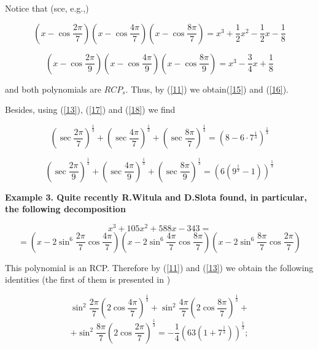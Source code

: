 \documentclass[12pt,oneside,english]{amsart}
\begin{document}
Notice that (sce, e.g.,\cite{6})

\begin{equation}\label{17}
\left(x-\cos\frac{2\pi}{7}\right)\left(x-\cos\frac
{4\pi}{7}\right)\left(x-\cos\frac{8\pi}{7}\right) =x^3+\frac 1 2
x^2-\frac 1 2 x-\frac 1 8
\end{equation}

\begin{equation}\label{18}
\left(x-\cos\frac{2\pi}{9}\right)\left(x-\cos\frac
{4\pi}{9}\right)\left(x-\cos\frac{8\pi}{9}\right) =x^3-\frac 3 4
x+\frac 1 8
\end{equation}

and both polynomials are $RCP_s$. Thus, by (\ref{11}) we
obtain(\ref{15}) and (\ref{16}).


     Besides, using (\ref{13}), (\ref{17}) and (\ref{18}) we find
\newpage

\begin{equation}\label{19}
\left(\sec\frac{2\pi}{7}\right)^{\frac 1 3}+\left(\sec\frac
{4\pi}{7}\right)^{\frac 1 3}+\left(\sec\frac{8\pi}{7}\right)^{\frac
1 3}=\left(8-6\cdot 7^{\frac 1 3} \right)^{\frac 1 3}
\end{equation}

\begin{equation}\label{20}
\left(\sec\frac{2\pi}{9}\right)^{\frac 1 3}+\left(\sec\frac
{4\pi}{9}\right)^{\frac 1 3}+\left(\sec\frac{8\pi}{9}\right)^{\frac
1 3}=\left(6(9^{\frac 1 3}-1)\right)^{\frac 1 3}
\end{equation}



\bfseries Example 3. \mdseries Quite recently R.Witula and D.Slota
\cite{7} found, in particular, the following decomposition

$$
x^3+105 x^2+588 x-343=
$$
\begin{equation}\label{21}
=(x-2\sin^6\frac{2\pi}{7}\cos\frac{4\pi}{7})(x-2\sin^6\frac{4\pi}{7}\cos\frac{8\pi}{7})
(x-2\sin^6\frac{8\pi}{7}\cos\frac{2\pi}{7})
\end{equation}

This polynomial is an  RCP. Therefore by (\ref{11}) and (\ref{13})
we obtain the following identities (the first of them is presented
in \cite{7})

$$
\sin^2\frac{2\pi}{7}\left(2\cos\frac{4\pi}{7}\right)^{\frac 1
3}+\sin^2\frac{4\pi}{7}\left(2\cos\frac {8\pi}{7}\right)^{\frac 1
3}+
$$
\begin{equation}\label{22}
+\sin^2\frac{8\pi}{7}\left(2\cos\frac{2\pi}{7}\right)^{\frac 1
3}=-\frac 1 4\left(63(1+7^{\frac 1 3})\right)^{\frac 1 3};
\end{equation}
\end{document}
